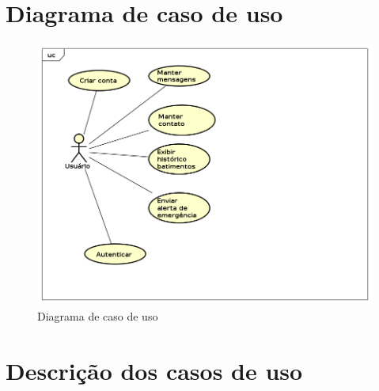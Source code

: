 \documentclass[
	12pt,				%
	openright,			%
	twoside,			%
	a4paper,			%
	english,			%
	french,				%
	spanish,			%
	brazil				%
]{abntex2}
\begin{document}
\chapter{Diagrama de caso de uso}
\begin{figure}[h]
	\label{figure_diagrama_caso_uso}
	\caption{Diagrama de caso de uso}
	\includegraphics[scale=0.6]{UseCase.png}
	\hfill
\end{figure}
\chapter{Descrição dos casos de uso}
%

%

%

%

%

%

%
\end{document}
